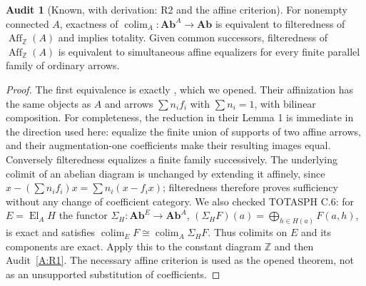 \documentclass[11pt,a4paper]{article}
\newcommand{\Ab}{\mathbf{Ab}}
\newcommand{\Z}{\mathbb Z}
\newcommand{\El}{\operatorname{El}}
\newcommand{\Aff}{\operatorname{Aff}}
\newcommand{\colim}{\operatorname*{colim}}
\theoremstyle{definition}
\newtheorem{audit}[theorem]{Audit}
\begin{document}
\begin{audit}[Known, with derivation: R2 and the affine criterion]\label{A:R2}
For nonempty connected $A$, exactness of $\colim_A:\Ab^A\to\Ab$ is equivalent to filteredness of $\Aff_\Z(A)$ and implies totality. Given common successors, filteredness of $\Aff_\Z(A)$ is equivalent to simultaneous affine equalizers for every finite parallel family of ordinary arrows.
\end{audit}
\begin{proof}
The first equivalence is exactly \citet[Theorem 1, pp.~994--995]{IsbellMitchell1973}, which we opened. Their affinization has the same objects as $A$ and arrows $\sum n_if_i$ with $\sum n_i=1$, with bilinear composition. For completeness, the reduction in their Lemma 1 is immediate in the direction used here: equalize the finite union of supports of two affine arrows, and their augmentation-one coefficients make their resulting images equal. Conversely filteredness equalizes a finite family successively. The underlying colimit of an abelian diagram is unchanged by extending it affinely, since $x-(\sum n_if_i)x=\sum n_i(x-f_ix)$; filteredness therefore proves sufficiency without any change of coefficient category. We also checked TOTASPH C.6: for $E=\El_AH$ the functor $\Sigma_H:\Ab^E\to\Ab^A$, $(\Sigma_HF)(a)=\bigoplus_{h\in H(a)}F(a,h)$, is exact and satisfies $\colim_EF\cong\colim_A\Sigma_HF$. Thus colimits on $E$ and its components are exact. Apply this to the constant diagram $\Z$ and then Audit~\ref{A:R1}. The necessary affine criterion is used as the opened theorem, not as an unsupported substitution of coefficients.
\end{proof}
\end{document}
